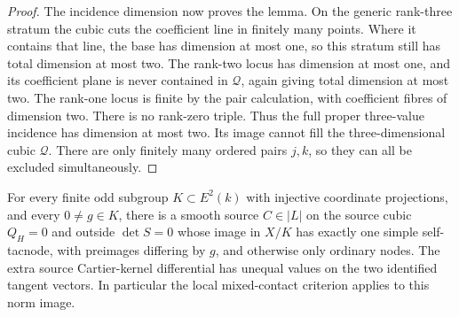 \begin{proof}
The incidence dimension now proves the lemma. On the generic
rank-three stratum the cubic cuts the coefficient line in finitely
many points. Where it contains that line, the base has dimension at
most one, so this stratum still has total dimension at most two.
The rank-two locus has dimension at most one, and its coefficient
plane is never contained in $\mathcal Q$, again giving total
dimension at most two. The rank-one locus is finite by the pair
calculation, with coefficient fibres of dimension two. There is
no rank-zero triple. Thus the full proper three-value incidence
has dimension at most two. Its image cannot fill the
three-dimensional cubic $\mathcal Q$. There are only finitely many
ordered pairs $j,k$, so they can all be excluded simultaneously.
\end{proof}

\begin{proposition}
\label{prop:ss-uniform-graph-mixed-contact}
For every finite odd subgroup $K\subset E^2(k)$ with injective
coordinate projections, and every $0\ne g\in K$, there is a smooth
source $C\in|L|$ on the source cubic $Q_H=0$ and outside $\det S=0$
whose image in $X/K$ has exactly one simple self-tacnode, with
preimages differing by $g$, and otherwise only ordinary nodes.
The extra source Cartier-kernel differential has unequal values on
the two identified tangent vectors. In particular the local
mixed-contact criterion applies to this norm image.
\end{proposition}
